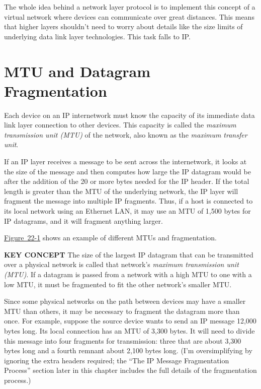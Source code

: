 The whole idea behind a network layer protocol is to implement this
concept of a virtual network where devices can communicate over great
distances. This means that higher layers shouldn't need to worry about
details like the size limits of underlying data link layer technologies.
This task falls to
\protect\hypertarget{ch22.htmlux5cux23idx-CHP-22-0796}{}{}IP.



\section{MTU and Datagram Fragmentation}

\protect\hypertarget{ch22.htmlux5cux23idx-CHP-22-0797}{}{}\protect\hypertarget{ch22.htmlux5cux23idx-CHP-22-0798}{}{}
Each device on an IP internetwork must know the capacity of its
immediate data link layer connection to other devices. This capacity is
called the
\protect\hypertarget{ch22.htmlux5cux23idx-CHP-22-0799}{}{}{\emph{maximum
transmission unit
(MTU)}}\protect\hypertarget{ch22.htmlux5cux23idx-CHP-22-0800}{}{} of the
network, also known as the
\protect\hypertarget{ch22.htmlux5cux23idx-CHP-22-0801}{}{}{\emph{maximum
transfer unit}}.

If an IP layer receives a message to be sent across the internetwork, it
looks at the size of the message and then computes how large the IP
datagram would be after the addition of the 20 or more bytes needed for
the IP header. If the total length is greater than the MTU of the
underlying network, the IP layer will fragment the message into multiple
IP fragments. Thus, if a host is connected to its local network using an
Ethernet LAN, it may use an MTU of 1,500 bytes for IP datagrams, and it
will fragment anything larger.

\protect\hyperlink{ch22.htmlux5cux23ip_maximum_transmission_unit_mtu_and_fra}{Figure~22-1}
shows an example of different MTUs and fragmentation.


{\textbf{KEY CONCEPT}} The size of the largest IP datagram that can be
transmitted over a physical network is called that network's
{\emph{maximum transmission unit (MTU)}}. If a datagram is passed from a
network with a high MTU to one with a low MTU, it must be fragmented to
fit the other network's smaller MTU.

Since some physical networks on the path between devices may have a
smaller MTU than others, it may be necessary to fragment the datagram
more than once. For example, suppose the source device wants to send an
IP message 12,000 bytes long. Its local connection has an MTU of 3,300
bytes. It will need to divide this message into four fragments for
transmission: three that are about 3,300 bytes long and a fourth remnant
about 2,100 bytes long. (I'm oversimplifying by ignoring the extra
headers required; the ``The IP Message Fragmentation Process'' section
later in this chapter includes the full details of the fragmentation
process.)

